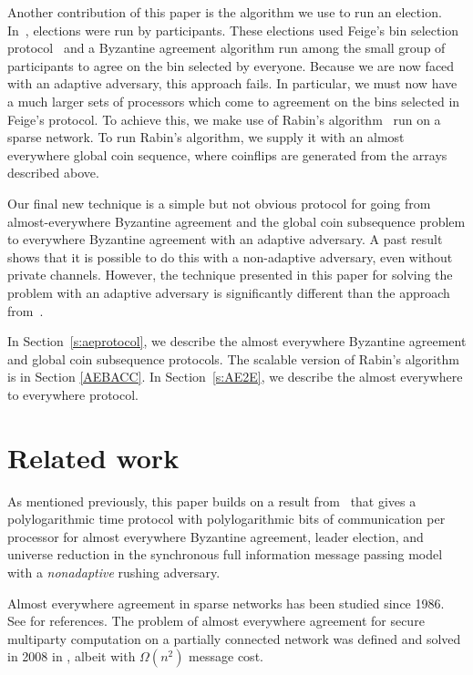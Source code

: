 \documentclass{sig-alternate}
\begin{document}
Another contribution of this paper is the algorithm we use to run an election.  In~\cite{KSSV}, elections were run by participants.  These elections used Feige's bin selection protocol~\cite{Feige} and a Byzantine agreement algorithm run among the small group of participants to agree on the bin selected by everyone.  Because we are now faced with an adaptive adversary, this approach fails.  In particular, we must now have a much larger sets of processors which come to agreement on the bins selected in Feige's protocol.  To achieve this, we make use of Rabin's algorithm~\cite{rabin1983randomized} run on a sparse network.  
To run Rabin's algorithm, we supply it with an almost everywhere global coin sequence, where coinflips are generated from the arrays described above.  

Our final new technique is a simple but not obvious protocol for going from almost-everywhere Byzantine agreement and the global coin subsequence problem to everywhere Byzantine agreement with an adaptive adversary.  A past result~\cite{KSDISC09} shows that it is possible to do this with a non-adaptive adversary, even without private channels.  However, the technique presented in this paper for solving the problem with an adaptive adversary is significantly different than the approach from~\cite{KSDISC09}.

 \medskip
 
In Section~\ref{s:aeprotocol}, we describe the almost everywhere Byzantine agreement  and global coin subsequence protocols. The scalable version of Rabin's algorithm is in Section \ref{AEBACC}.  In Section~\ref{s:AE2E}, we describe the almost everywhere to everywhere protocol. 

\section{Related work}

As mentioned previously, this paper builds on a result from~\cite{KSSV} that gives a polylogarithmic time protocol with polylogarithmic bits of communication per processor for almost everywhere Byzantine agreement, leader election, and universe reduction in the synchronous full information message passing model with a \emph{nonadaptive} rushing adversary. 
 
Almost everywhere agreement in sparse networks has been studied since 1986. See \cite{KSSV,KSSV2} for references. The problem of almost everywhere agreement for secure multiparty computation on a partially connected network was defined and solved in 2008 in \cite{GO}, albeit with $\Omega(n^{2})$ message cost.
\end{document}
